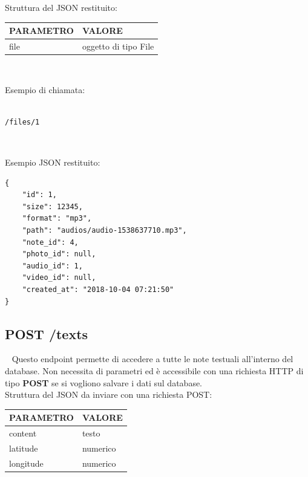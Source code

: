 \pagebreak

Struttura del JSON restituito:

\begin{table}[!h]
	\centering
	\begin{tabular}{@{}ll@{}}
		\toprule
		\textbf{PARAMETRO} & \textbf{VALORE}  \\ \midrule
		file              & oggetto di tipo File \\ \bottomrule
	\end{tabular}
\end{table}

\ \linebreak

Esempio di chiamata:
\begin{lstlisting}

/files/1

\end{lstlisting}

\ \linebreak

Esempio JSON restituito:
\begin{lstlisting}
{
	"id": 1,
	"size": 12345,
	"format": "mp3",
	"path": "audios/audio-1538637710.mp3",
	"note_id": 4,
	"photo_id": null,
	"audio_id": 1,
	"video_id": null,
	"created_at": "2018-10-04 07:21:50"
}
\end{lstlisting}

\subsection{POST /texts}
\ \linebreak
Questo endpoint permette di accedere a tutte le note testuali all'interno del database. Non necessita di parametri ed è accessibile con una richiesta HTTP di tipo \textbf{POST} se si vogliono salvare i dati sul database.\\

Struttura del JSON da inviare con una richiesta POST:

\begin{table}[!h]
	\centering
	\begin{tabular}{@{}ll@{}}
		\toprule
		\textbf{PARAMETRO} & \textbf{VALORE}  \\ \midrule
		content            & testo\\ 
		latitude           & numerico\\ 
		longitude          & numerico\\ \bottomrule		
	\end{tabular}
\end{table}

